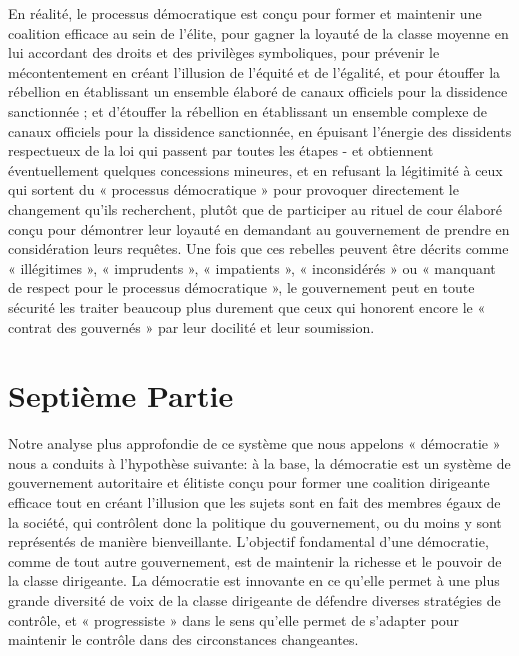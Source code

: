 En réalité, le processus démocratique est conçu pour former et maintenir une coalition efficace au sein de l'élite, pour gagner la loyauté de la classe moyenne en lui accordant des droits et des privilèges symboliques, pour prévenir le mécontentement en créant l'illusion de l'équité et de l'égalité, et pour étouffer la rébellion en établissant un ensemble élaboré de canaux officiels pour la dissidence sanctionnée ; et d'étouffer la rébellion en établissant un ensemble complexe de canaux officiels pour la dissidence sanctionnée, en épuisant l'énergie des dissidents respectueux de la loi qui passent par toutes les étapes - et obtiennent éventuellement quelques concessions mineures, et en refusant la légitimité à ceux qui sortent du « processus démocratique » pour provoquer directement le changement qu'ils recherchent, plutôt que de participer au rituel de cour élaboré conçu pour démontrer leur loyauté en demandant au gouvernement de prendre en considération leurs requêtes. Une fois que ces rebelles peuvent être décrits comme « illégitimes », « imprudents », « impatients », « inconsidérés » ou « manquant de respect pour le processus démocratique », le gouvernement peut en toute sécurité les traiter beaucoup plus durement que ceux qui honorent encore le « contrat des gouvernés » par leur docilité et leur soumission.

\chapter*{\textbf{Septième Partie}}

Notre analyse plus approfondie de ce système que nous appelons « démocratie » nous a conduits à l'hypothèse suivante: à la base, la démocratie est un système de gouvernement autoritaire et élitiste conçu pour former une coalition dirigeante efficace tout en créant l'illusion que les sujets sont en fait des membres égaux de la société, qui contrôlent donc la politique du gouvernement, ou du moins y sont représentés de manière bienveillante. L'objectif fondamental d'une démocratie, comme de tout autre gouvernement, est de maintenir la richesse et le pouvoir de la classe dirigeante. La démocratie est innovante en ce qu'elle permet à une plus grande diversité de voix de la classe dirigeante de défendre diverses stratégies de contrôle, et « progressiste » dans le sens qu'elle permet de s'adapter pour maintenir le contrôle dans des circonstances changeantes.

